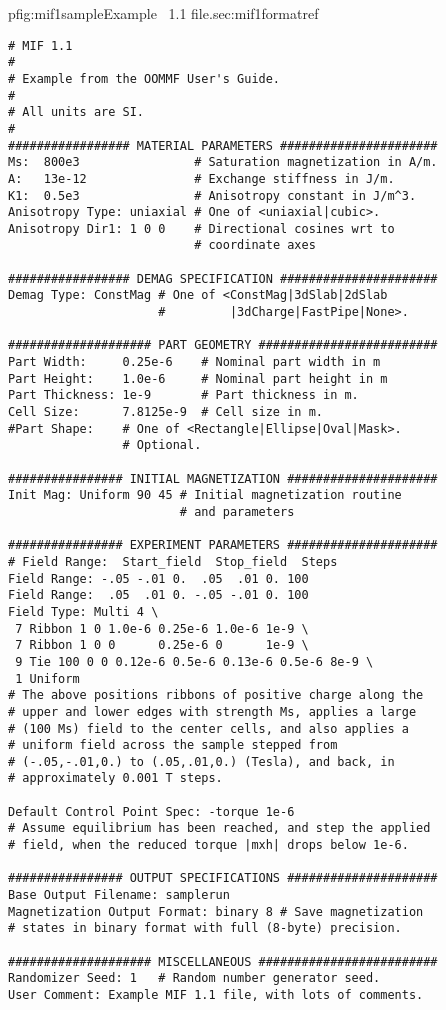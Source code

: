 \begin{codelisting}{p}{fig:mif1sample}{Example \MIF~1.1
      file.}{sec:mif1format}{ref}
\begin{verbatim}
# MIF 1.1
#
# Example from the OOMMF User's Guide.
#
# All units are SI.
#
################# MATERIAL PARAMETERS ######################
Ms:  800e3                # Saturation magnetization in A/m.
A:   13e-12               # Exchange stiffness in J/m.
K1:  0.5e3                # Anisotropy constant in J/m^3.
Anisotropy Type: uniaxial # One of <uniaxial|cubic>.
Anisotropy Dir1: 1 0 0    # Directional cosines wrt to
                          # coordinate axes

################# DEMAG SPECIFICATION ######################
Demag Type: ConstMag # One of <ConstMag|3dSlab|2dSlab
                     #         |3dCharge|FastPipe|None>.

#################### PART GEOMETRY #########################
Part Width:     0.25e-6    # Nominal part width in m
Part Height:    1.0e-6     # Nominal part height in m
Part Thickness: 1e-9       # Part thickness in m.
Cell Size:      7.8125e-9  # Cell size in m.
#Part Shape:    # One of <Rectangle|Ellipse|Oval|Mask>.
                # Optional.

################ INITIAL MAGNETIZATION #####################
Init Mag: Uniform 90 45 # Initial magnetization routine
                        # and parameters

################ EXPERIMENT PARAMETERS #####################
# Field Range:  Start_field  Stop_field  Steps
Field Range: -.05 -.01 0.  .05  .01 0. 100
Field Range:  .05  .01 0. -.05 -.01 0. 100
Field Type: Multi 4 \
 7 Ribbon 1 0 1.0e-6 0.25e-6 1.0e-6 1e-9 \
 7 Ribbon 1 0 0      0.25e-6 0      1e-9 \
 9 Tie 100 0 0 0.12e-6 0.5e-6 0.13e-6 0.5e-6 8e-9 \
 1 Uniform
# The above positions ribbons of positive charge along the
# upper and lower edges with strength Ms, applies a large
# (100 Ms) field to the center cells, and also applies a
# uniform field across the sample stepped from
# (-.05,-.01,0.) to (.05,.01,0.) (Tesla), and back, in
# approximately 0.001 T steps.

Default Control Point Spec: -torque 1e-6
# Assume equilibrium has been reached, and step the applied
# field, when the reduced torque |mxh| drops below 1e-6.

################ OUTPUT SPECIFICATIONS #####################
Base Output Filename: samplerun
Magnetization Output Format: binary 8 # Save magnetization
# states in binary format with full (8-byte) precision.

#################### MISCELLANEOUS #########################
Randomizer Seed: 1   # Random number generator seed.
User Comment: Example MIF 1.1 file, with lots of comments.
\end{verbatim}
\end{codelisting}

